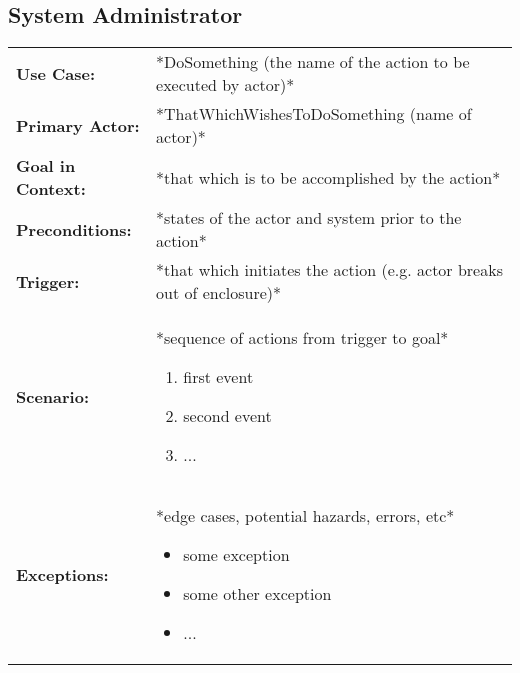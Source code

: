 \documentclass[12pt]{article}
\begin{document}
    

    \subsection{System Administrator}
    \begin{table}[H]
    \begin{tabular}{lp{9.9cm}}
        \hline
        \textbf{Use Case:}                     & *DoSomething (the name of the action to be executed by actor)* \\

        \textbf{Primary Actor:}                & *ThatWhichWishesToDoSomething (name of actor)*\\

        \textbf{Goal in Context:}              & *that which is to be accomplished by the action* \\

        \textbf{Preconditions:}                & *states of the actor and system prior to the action* \\

        \textbf{Trigger:}                      & *that which initiates the action (e.g. actor breaks out of enclosure)*\\

        \textbf{Scenario:}                     & *sequence of actions from trigger to goal*
                                                 \begin{enumerate}
                                                     \item first event
                                                     \item second event
                                                     \item ...
                                                 \end{enumerate} \\

        \textbf{Exceptions:}                   & *edge cases, potential hazards, errors, etc*
                                                 \begin{itemize}
                                                     \item[] some exception
                                                     \item[] some other exception
                                                     \item[] ...
                                                 \end{itemize}\\


\end{tabular}
\end{table}
\end{document}

